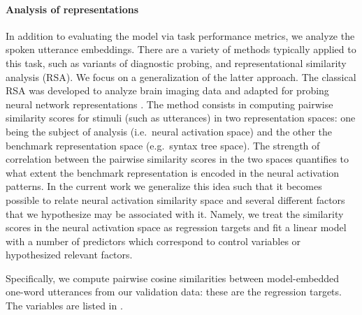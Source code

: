 \paragraph{Analysis of representations}
In addition to evaluating the model via task performance metrics, we
analyze the spoken utterance embeddings. There are a variety of
methods typically applied to this task, such as variants of diagnostic
probing, and representational similarity analysis (RSA). We focus on
a generalization of the latter approach.
The classical RSA was developed to analyze brain imaging data
\citep{kriegeskorte2008representational} and adapted for probing
neural network representations
\citep[e.g.][]{chrupala-alishahi-2019-correlating}. The method
consists in computing pairwise similarity scores for stimuli (such as
utterances) in two representation spaces: one being the subject of
analysis (i.e.\ neural activation space) and the other the benchmark
representation space (e.g.\ syntax tree space). The strength of
correlation between the pairwise similarity scores in the two spaces
quantifies to what extent the benchmark representation is encoded in
the neural activation patterns. In the current work we generalize this
idea such that it becomes possible to relate
neural activation similarity space and several different factors that
we hypothesize may be associated with it. Namely, we treat the
similarity scores in the neural activation space as regression targets
and fit a linear model with a number of predictors which 
correspond to control variables or hypothesized relevant factors.

Specifically, we compute pairwise cosine similarities between
model-embedded one-word utterances from our validation data: these are
the regression targets. The variables are listed in .

